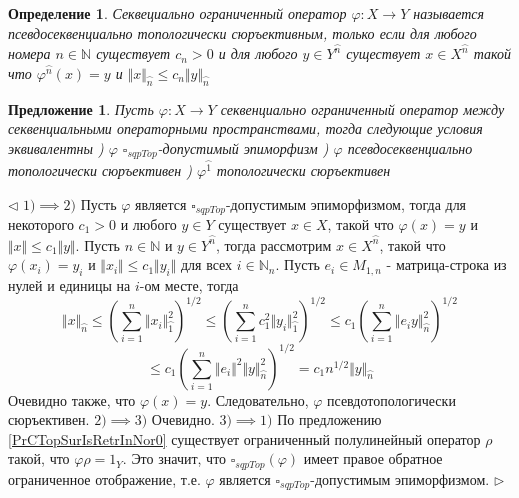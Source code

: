 \documentclass[12pt]{article}
\newtheorem{proposition}[theorem]{Предложение}
\newtheorem{definition}[theorem]{Определение}
\newenvironment{proof}{\par $\triangleleft$}{$\triangleright$}
\begin{document}
\begin{definition}\label{DefPsSQTopSurjOp} Секвециально ограниченный оператор $\varphi:X\to Y$ называется псевдосеквенциально топологически сюръективным, только если для любого номера $n\in\mathbb{N}$ 
существует $c_n>0$ и для любого $y\in Y^{\wideparen{n}}$ существует $x\in X^{\wideparen{n}}$ такой что $\varphi^{\wideparen{n}}(x)=y$ и $\Vert x\Vert_{\wideparen{n}}\leq c_n\Vert y\Vert_{\wideparen{n}}$ 
\end{definition}

\begin{proposition}\label{PrDecsPsTopAdmEpiMorph} Пусть $\varphi:X\to Y$ секвенциально ограниченный оператор между секвенциальными операторными пространствами, тогда следующие условия эквивалентны
) $\varphi$ $\square_{sqpTop}$-допустимый эпиморфизм
) $\varphi$ псевдосеквенциально топологически сюръективен
) $\varphi^{\wideparen{1}}$ топологически сюръективен 
\end{proposition}
\begin{proof}
$1)\implies 2)$ Пусть $\varphi$ является $\square_{sqpTop}$-допустимым эпиморфизмом, тогда для некоторого $c_1>0$ и любого $y\in Y$ существует $x\in X$, такой что $\varphi(x)=y$ и $\Vert x\Vert\leq c_1\Vert y\Vert$. Пусть $n\in\mathbb{N}$ и  $y\in Y^{\wideparen{n}}$, тогда рассмотрим $x\in X^{\wideparen{n}}$, такой 
что $\varphi(x_i)=y_i$ и $\Vert x_i\Vert\leq c_1\Vert y_i\Vert$ для всех $i\in\mathbb{N}_n$. Пусть $e_i\in M_{1,n}$ -  матрица-строка из нулей и единицы на $i$-ом месте, тогда 
$$
\Vert x\Vert_{\wideparen{n}}
\leq  \left(\sum\limits_{i=1}^n\Vert x_i\Vert_{\wideparen{1}}^2\right)^{1/2}
\leq  \left(\sum\limits_{i=1}^n c_1^2\Vert y_i\Vert_{\wideparen{1}}^2\right)^{1/2}
\leq c_1\left(\sum\limits_{i=1}^n\Vert e_i y\Vert_{\wideparen{n}}^2\right)^{1/2}
$$
$$
\leq c_1\left(\sum\limits_{i=1}^n\Vert e_i\Vert^2 \Vert y\Vert_{\wideparen{n}}^2\right)^{1/2}
=c_1n^{1/2}\Vert y\Vert_{\wideparen{n}}
$$
Очевидно также, что $\varphi(x)=y$. Следовательно, $\varphi$ псевдотопологически сюръективен.
\newline
$2)\implies 3)$ Очевидно.
\newline
$3)\implies 1)$ По предложению \ref{PrCTopSurIsRetrInNor0} существует ограниченный полулинейный оператор $\rho$ такой, что $\varphi\rho=1_Y$. Это значит, что $\square_{sqpTop}(\varphi)$ имеет правое обратное ограниченное отображение, т.е. $\varphi$ является $\square_{sqpTop}$-допустимым эпиморфизмом. 
\end{proof}
\end{document}
